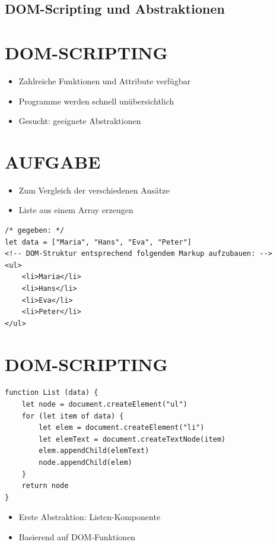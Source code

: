 \subsection{DOM-Scripting und Abstraktionen}

\section*{DOM-SCRIPTING}
\begin{itemize}
  \item Zahlreiche Funktionen und Attribute verfügbar
  \item Programme werden schnell unübersichtlich
  \item Gesucht: geeignete Abstraktionen
\end{itemize}

\section*{AUFGABE}
\begin{itemize}
  \item Zum Vergleich der verschiedenen Ansätze
  \item Liste aus einem Array erzeugen
\end{itemize}

\begin{verbatim}
/* gegeben: */
let data = ["Maria", "Hans", "Eva", "Peter"]
<!-- DOM-Struktur entsprechend folgendem Markup aufzubauen: -->
<ul>
    <li>Maria</li>
    <li>Hans</li>
    <li>Eva</li>
    <li>Peter</li>
</ul>
\end{verbatim}

\section*{DOM-SCRIPTING}
\begin{verbatim}
function List (data) {
    let node = document.createElement("ul")
    for (let item of data) {
        let elem = document.createElement("li")
        let elemText = document.createTextNode(item)
        elem.appendChild(elemText)
        node.appendChild(elem)
    }
    return node
}
\end{verbatim}

\begin{itemize}
  \item Erste Abstraktion: Listen-Komponente
  \item Basierend auf DOM-Funktionen
\end{itemize}

